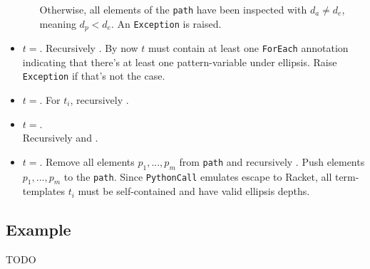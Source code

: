 \begin{itemize}
\begin{itemize}
	  Otherwise, all elements of the \texttt{path} have been inspected with $d_a \neq d_e$, meaning $d_p < d_e$. An \texttt{Exception} is raised.
	\end{itemize}
\item
$t=$\TermRepeat. Recursively . By now $t$ must contain at least one \texttt{ForEach} annotation indicating that there's at least one pattern-variable under ellipsis. Raise \texttt{Exception} if that's not the case.
\item
$t=$\TermSequence. For $t_i$, recursively .
\item
$t=$\TermInHole. \\ Recursively  and .
\item
$t=$\PythonCall. Remove all elements $p_1, ..., p_m$ from \texttt{path} and recursively . Push elements $p_1, ..., p_m$ to the \texttt{path}. Since \texttt{PythonCall} emulates escape to Racket, all term-templates $t_i$ must be self-contained and have valid ellipsis depths.
\end{itemize}

\subsection{Example}
TODO
